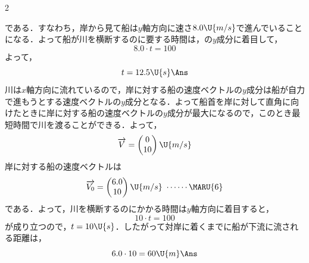 \begin{multicols}{2}
\begin{komon}
       である．すなわち，岸から見て船は$y$軸方向に速さ$8.0\U{m/s}$で進んでいることになる．よって船が川を横断するのに要する時間は，の$y$成分に着目して，
       \[8.0\cdot t=100\]
       よって，
       \[t=12.5\U{s}\Ans\]
 川は$x$軸方向に流れているので，岸に対する船の速度ベクトルの$y$成分は船が自力で進もうとする速度ベクトルの$y$成分となる．よって船首を岸に対して直角に向けたときに岸に対する船の速度ベクトルの$y$成分が最大になるので，このとき最短時間で川を渡ることができる．よって，
       \[\overrightarrow{V}=\begin{pmatrix}0\\10\end{pmatrix}\U{m/s}\]
       岸に対する船の速度ベクトルは
       \[\overrightarrow{V_0}=\begin{pmatrix}6.0\\10\end{pmatrix}\U{m/s}\ \cdots\cdots\MARU{6}\]
       である．よって，川を横断するのにかかる時間は$y$軸方向に着目すると，
       \[10\cdot t=100\]
       が成り立つので，$t=10\U{s}$．したがって対岸に着くまでに船が下流に流される距離は，
       \[6.0\cdot 10=60\U{m}\Ans\]
\end{komon}


\end{multicols}
